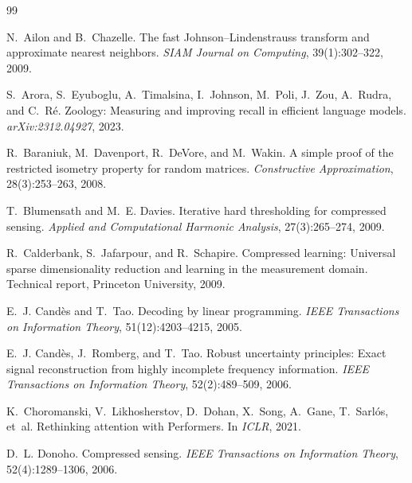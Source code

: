 \documentclass[11pt]{article}
\begin{document}

\begin{thebibliography}{99}

N.~Ailon and B.~Chazelle.
\newblock The fast Johnson--Lindenstrauss transform and approximate nearest neighbors.
\newblock \emph{SIAM Journal on Computing}, 39(1):302--322, 2009.

S.~Arora, S.~Eyuboglu, A.~Timalsina, I.~Johnson, M.~Poli, J.~Zou, A.~Rudra, and C.~R{\'e}.
\newblock Zoology: Measuring and improving recall in efficient language models.
\newblock \emph{arXiv:2312.04927}, 2023.

R.~Baraniuk, M.~Davenport, R.~DeVore, and M.~Wakin.
\newblock A simple proof of the restricted isometry property for random matrices.
\newblock \emph{Constructive Approximation}, 28(3):253--263, 2008.

T.~Blumensath and M.~E. Davies.
\newblock Iterative hard thresholding for compressed sensing.
\newblock \emph{Applied and Computational Harmonic Analysis}, 27(3):265--274, 2009.

R.~Calderbank, S.~Jafarpour, and R.~Schapire.
\newblock Compressed learning: Universal sparse dimensionality reduction and learning in the measurement domain.
\newblock Technical report, Princeton University, 2009.

E.~J. Cand{\`e}s and T.~Tao.
\newblock Decoding by linear programming.
\newblock \emph{IEEE Transactions on Information Theory}, 51(12):4203--4215, 2005.

E.~J. Cand{\`e}s, J.~Romberg, and T.~Tao.
\newblock Robust uncertainty principles: Exact signal reconstruction from highly incomplete frequency information.
\newblock \emph{IEEE Transactions on Information Theory}, 52(2):489--509, 2006.

K.~Choromanski, V.~Likhosherstov, D.~Dohan, X.~Song, A.~Gane, T.~Sarl{\'o}s, et~al.
\newblock Rethinking attention with Performers.
\newblock In \emph{ICLR}, 2021.

D.~L. Donoho.
\newblock Compressed sensing.
\newblock \emph{IEEE Transactions on Information Theory}, 52(4):1289--1306, 2006.


\end{thebibliography}
\end{document}
